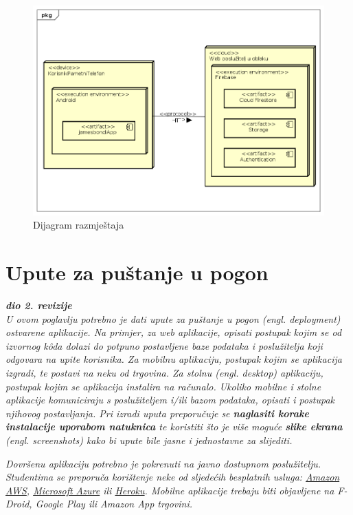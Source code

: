 			
			\begin{figure}[h]
				\includegraphics[scale=0.6]{dijagrami/Dijagram_razmjestaja.PNG}
				\centering
				\caption{Dijagram razmještaja}
				\label{fig:Dijagram_razmjestaja}
			\end{figure}
		
			
			\eject 
		
		\section{Upute za puštanje u pogon}
		
			\textbf{\textit{dio 2. revizije}}\\
		
			 \textit{U ovom poglavlju potrebno je dati upute za puštanje u pogon (engl. deployment) ostvarene aplikacije. Na primjer, za web aplikacije, opisati postupak kojim se od izvornog kôda dolazi do potpuno postavljene baze podataka i poslužitelja koji odgovara na upite korisnika. Za mobilnu aplikaciju, postupak kojim se aplikacija izgradi, te postavi na neku od trgovina. Za stolnu (engl. desktop) aplikaciju, postupak kojim se aplikacija instalira na računalo. Ukoliko mobilne i stolne aplikacije komuniciraju s poslužiteljem i/ili bazom podataka, opisati i postupak njihovog postavljanja. Pri izradi uputa preporučuje se \textbf{naglasiti korake instalacije uporabom natuknica} te koristiti što je više moguće \textbf{slike ekrana} (engl. screenshots) kako bi upute bile jasne i jednostavne za slijediti.}
			
			
			 \textit{Dovršenu aplikaciju potrebno je pokrenuti na javno dostupnom poslužitelju. Studentima se preporuča korištenje neke od sljedećih besplatnih usluga: \href{https://aws.amazon.com/}{Amazon AWS}, \href{https://azure.microsoft.com/en-us/}{Microsoft Azure} ili \href{https://www.heroku.com/}{Heroku}. Mobilne aplikacije trebaju biti objavljene na F-Droid, Google Play ili Amazon App trgovini.}
			
			
			\eject 
